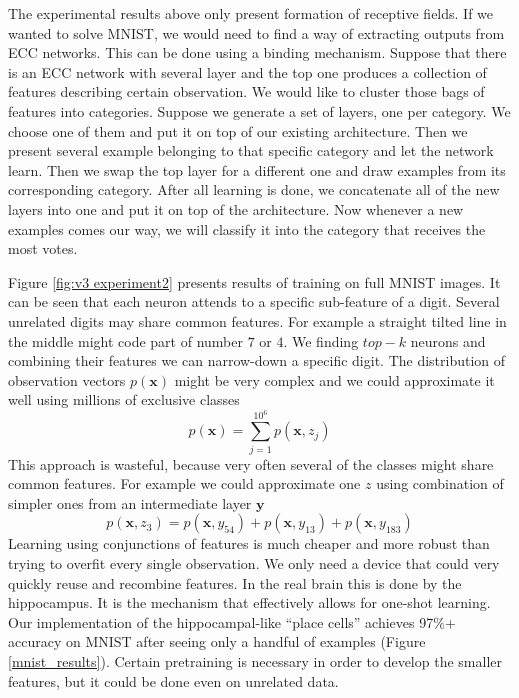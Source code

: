 \documentclass[12pt]{article}
\begin{document}
The experimental results above only present formation of receptive fields. If we wanted to solve MNIST, we would need to find a way of extracting outputs from ECC networks. This can be done using a binding mechanism. 
Suppose that there is an ECC network with several layer and the top one produces a collection of features describing certain observation. We would like to cluster those bags of features into categories. Suppose we generate a set of layers, one per category. We choose one of them and put it on top of our existing architecture. Then we present several example belonging to that specific category and let the network learn. Then we swap the top layer for a different one and draw examples from its corresponding category. After all learning is done, we concatenate all of the new layers into one and put it on top of the architecture. Now whenever a new examples comes our way, we will classify it into the category that receives the most votes.

Figure \ref{fig:v3 experiment2} presents results of training on full MNIST images. It can be seen that each neuron attends to a specific sub-feature of a digit. Several unrelated digits may share common features. For example a straight tilted line in the middle might code part of number $7$ or $4$. We finding $top-k$ neurons and combining their features we can narrow-down a specific digit. The distribution of observation vectors $p(\boldsymbol{x})$ might be very complex and we could approximate it well using millions of exclusive classes 
\[
p(\boldsymbol{x})=\sum_{j=1}^{10^6}p(\boldsymbol{x},z_j)
\]
This approach is wasteful, because very often several of the classes might share common features. For example we could approximate one $z$ using combination of  simpler ones from an intermediate layer $\boldsymbol{y}$ 
\[
p(\boldsymbol{x},z_3) = p(\boldsymbol{x},y_{54}) + p(\boldsymbol{x},y_{13}) + p(\boldsymbol{x},y_{183})
\] 
Learning using conjunctions of features is much cheaper and more robust than trying to overfit every single observation. We only need a device that could very quickly reuse and recombine features. In the real brain this is done by the hippocampus. It is the mechanism that effectively allows for one-shot learning.
Our implementation of the hippocampal-like ``place cells'' achieves 97\%+ accuracy on MNIST after seeing only a handful of examples (Figure \ref{mnist_results}). Certain pretraining is necessary in order to develop the smaller features, but it could be done even on unrelated data.
\end{document}
